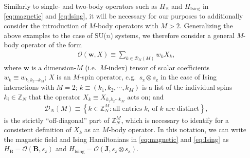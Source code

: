 \documentclass[nofootinbib,notitlepage,11pt]{revtex4-2}
\renewcommand{\t}{\text} %
\newcommand{\p}[1]{\left(#1\right)} %
\renewcommand{\set}[1]{\left\{#1\right\}} %
\newcommand{\m}{\bm} %
\newcommand{\1}{\mathds{1}}
\newcommand{\z}{\text{z}}
\newcommand{\D}{\mathcal{D}}
\renewcommand{\O}{\mathcal{O}}
\newcommand{\ZZ}{\mathbb{Z}}
\begin{document}
Similarly to single- and two-body operators such as $H_{\t{B}}$ and $H_{\t{Ising}}$ in \eqref{eq:magnetic} and \eqref{eq:Ising}, it will be necessary for our purposes to additionally consider the introduction of $M$-body operators with $M>2$. Generalizing the above examples to the case of SU($n$) systems, we therefore consider a general $M$-body operator of the form
\begin{align}
  \O\p{\m w,X} \equiv \sum_{k\in\D_N\p{M}} w_k X_k,
  \label{eq:multi_body_op}
\end{align}
where $\m w$ is a dimension-$M$ (i.e.~$M$-index) tensor of scalar coefficients $w_k\equiv w_{k_1k_2\cdots k_M}$; $X$ is an $M$-spin operator, e.g.~$s_\z\otimes s_\z$ in the case of Ising interactions with $M=2$; $k\equiv\p{k_1,k_2,\cdots,k_M}$ is a list of the individual spins $k_i\in\ZZ_N$ that the operator $X_k\equiv X_{k_1k_2\cdots k_M}$ acts on; and
\begin{align}
  \D_N\p{M} \equiv
  \set{ k \in \ZZ_N^M : \t{all entries $k_i$ of $k$ are distinct} },
  \label{eq:off_diags}
\end{align}
is the strictly ``off-diagonal'' part of $\ZZ_N^M$, which is necessary to identify for a consistent definition of $X_k$ as an $M$-body operator.
In this notation, we can write the magnetic field and Ising Hamiltonians in \eqref{eq:magnetic} and \eqref{eq:Ising} as $H_{\t{B}}=\O\p{\m B,s_\z}$ and $H_{\t{Ising}}=\O\p{\m J,s_\z\otimes s_\z}$.
\end{document}
